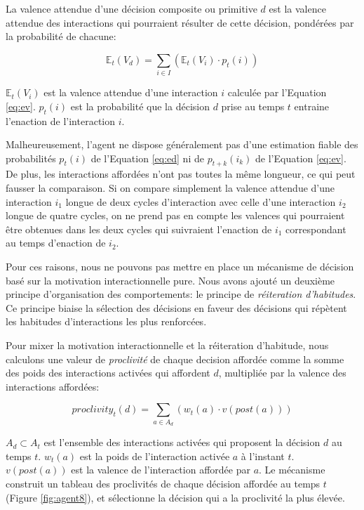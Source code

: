 La valence attendue d'une décision composite ou primitive $d$ est la valence attendue des interactions qui pourraient résulter de cette décision, pondérées par la probabilité de chacune: 

\begin{equation}\label{eq:ed}
	\mathbb{E}_t(V_d) = \sum_{i \in I} ( \mathbb{E}_t(V_i) \cdot p_t(i) )
\end{equation}

$\mathbb{E}_t(V_i)$ est la valence attendue d'une interaction $i$ calculée par l'Equation \eqref{eq:ev}. 
$p_t(i)$ est la probabilité que la décision $d$ prise au temps $t$ entraine l'enaction de l'interaction $i$. 

Malheureusement, l'agent ne dispose généralement pas d'une estimation fiable des probabilités $p_t(i)$ de l'Equation \eqref{eq:ed} ni de  $p_{t+k}(i_k)$ de l'Equation \eqref{eq:ev}.
De plus, les interactions affordées n'ont pas toutes la même longueur, ce qui peut fausser la comparaison. 
Si on compare simplement la valence attendue d'une interaction $i_1$ longue de deux cycles d'interaction avec celle d'une interaction $i_2$ longue de quatre cycles, on ne prend pas en compte les valences qui pourraient être obtenues dans les deux cycles qui suivraient l'enaction de $i_1$ correspondant au temps d'enaction de $i_2$.

Pour ces raisons, nous ne pouvons pas mettre en place un mécanisme de décision basé sur la motivation interactionnelle pure. 
Nous avons ajouté un deuxième principe d'organisation des comportements: le principe de \emph{réiteration d'habitudes}.
Ce principe biaise la sélection des décisions en faveur des décisions qui répètent les habitudes d'interactions les plus renforcées. 

Pour mixer la motivation interactionnelle et la réiteration d'habitude, 
nous calculons une valeur de \emph{proclivité} de chaque decision affordée comme  la somme des poids des interactions activées qui affordent $d$, multipliée par la valence des interactions affordées:

\begin{equation}\label{eq:proclivity}
	\displaystyle proclivity_t(d) = \sum_{a \in A_d} (w_t(a) \cdot v(post(a)))
\end{equation}

$A_d \subset A_t$ est l'ensemble des interactions activées qui proposent la décision $d$ au temps $t$.
$w_t(a)$ est la poids de l'interaction activée $a$ à l'instant $t$.
$v(post(a))$ est la valence de l'interaction affordée par $a$.
Le mécanisme construit un tableau des proclivités de chaque décision affordée au temps $t$ (Figure \ref{fig:agent8}), et sélectionne la décision qui a la proclivité la plus élevée.

